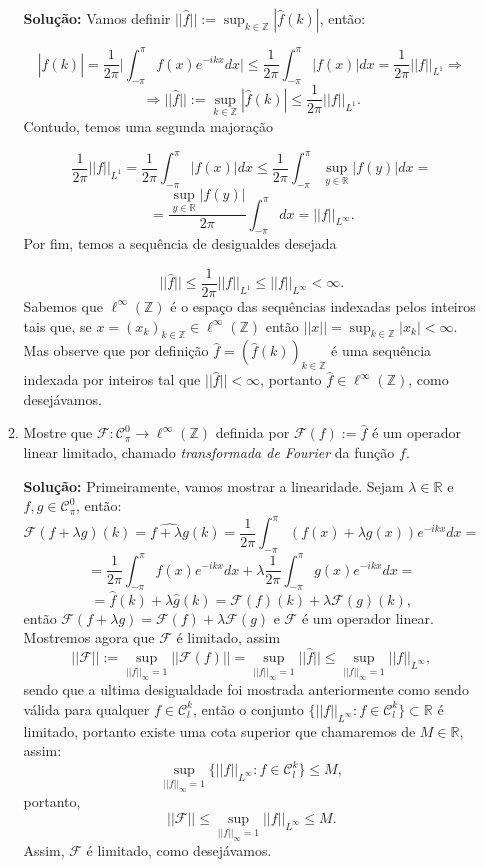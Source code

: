 \documentclass{article}
\begin{document}
\begin{enumerate}
\begin{enumerate}
			\textbf{Solução:} Vamos definir $||\hat{f}||:= \sup_{k \in \mathbb{Z}}|\hat{f}(k)|$, então:
			
			$$
			|\hat{f}(k)| = \frac{1}{2\pi} \Big |\int_{-\pi}^{\pi} f(x)e^{-ikx}dx \Big | \leq \frac{1}{2\pi} \int_{-\pi}^{\pi} |f(x)|dx = \frac{1}{2\pi}||f||_{L^{1}} \Rightarrow  
			$$
			$$
			\Rightarrow ||\hat{f}||:= \sup_{k \in \mathbb{Z}}|\hat{f}(k)| \leq \frac{1}{2\pi}||f||_{L^{1}}.
			$$
			Contudo, temos uma segunda majoração
			
			$$
			\frac{1}{2\pi}||f||_{L^{1}}= \frac{1}{2\pi} \int_{-\pi}^{\pi} |f(x)|dx \leq \frac{1}{2\pi} \int_{-\pi}^{\pi} \sup_{y \in \mathbb{R}}|f(y)|dx = 
			$$
			$$
			= \frac{\sup_{y \in \mathbb{R}}|f(y)|}{2\pi} \int_{-\pi}^{\pi} dx = ||f||_{L^{\infty}}.
			$$
			Por fim, temos a sequência de desigualdes desejada
			
			$$
			||\hat{f}|| \leq \frac{1}{2\pi}||f||_{L^{1}}\leq ||f||_{L^{\infty}} < \infty.
			$$
			Sabemos que $\ell^{\infty}(\mathbb{Z})$ é o espaço das sequências indexadas pelos inteiros tais que, se $x = (x_{k})_{k \in \mathbb{Z}} \in \ell^{\infty}(\mathbb{Z})$ então $||x|| = \sup_{k \in \mathbb{Z}}|x_{k}| < \infty$. Mas observe que por definição $\hat{f} = (\hat{f}(k))_{k \in \mathbb{Z}}$ é uma sequência indexada por inteiros tal que $||\hat{f}|| <\infty$, portanto $\hat{f} \in \ell^{\infty}(\mathbb{Z})$, como desejávamos.
			
			\item Mostre que $\mathcal{F}: \mathcal{C}^{0}_{\pi} \to \ell^{\infty}(\mathbb{Z})$ definida por $\mathcal{F}(f) := \hat{f}$ é um operador linear limitado, chamado \textit{transformada de Fourier} da função $f$.
			
			\textbf{Solução:} Primeiramente, vamos mostrar a linearidade. Sejam $\lambda \in \mathbb{R}$ e $f, g \in \mathcal{C}^{0}_{\pi}$, então:
			$$
			\mathcal{F}(f+\lambda g)(k) = \widehat{f+\lambda g}(k) =  \frac{1}{2\pi}\int_{-\pi}^{\pi} (f(x)+\lambda g(x))e^{-ikx}dx = 
			$$
			$$
			= \frac{1}{2\pi}\int_{-\pi}^{\pi} f(x)e^{-ikx}dx + \lambda \frac{1}{2\pi}\int_{-\pi}^{\pi} g(x)e^{-ikx}dx = 
			$$
			$$
			= \hat{f}(k) +\lambda \hat{g}(k) = \mathcal{F}(f)(k) + \lambda \mathcal{F}(g)(k),
			$$
			então $\mathcal{F}(f+\lambda g) = \mathcal{F}(f) + \lambda \mathcal{F}(g)$ e $\mathcal{F}$ é um operador linear. Mostremos agora que $\mathcal{F}$ é limitado, assim
			$$
			||\mathcal{F}|| := \sup_{||f||_{\infty}=1} ||\mathcal{F}(f)|| = \sup_{||f||_{\infty}=1} ||\hat{f}|| \leq \sup_{||f||_{\infty}=1} ||f||_{L^{\infty}},
			$$
			sendo que a ultima desigualdade foi mostrada anteriormente como sendo válida para qualquer $f \in \mathcal{C}^{k}_{l}$, então o conjunto $\{||f||_{L^{\infty}}: f \in \mathcal{C}^{k}_{l} \} \subset \mathbb{R} $ é limitado, portanto existe uma cota superior que chamaremos de $M \in \mathbb{R}$, assim:
			$$
			\sup\limits_{||f||_{\infty}=1} \{||f||_{L^{\infty}}: f \in \mathcal{C}^{k}_{l} \} \leq M,
			$$
			portanto,
			$$
			||\mathcal{F}|| \leq \sup_{||f||_{\infty}=1} ||f||_{L^{\infty}} \leq M.
			$$
			Assim, $\mathcal{F}$ é limitado, como desejávamos.
			
		\end{enumerate}
		
	\end{enumerate}
		
\end{document}
